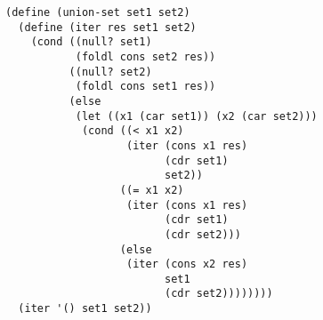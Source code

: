 \documentclass[a4paper,12pt]{article}
\begin{document}
\begin{lstlisting}
(define (union-set set1 set2)
  (define (iter res set1 set2)
    (cond ((null? set1)
           (foldl cons set2 res))
          ((null? set2)
           (foldl cons set1 res)) 
          (else
           (let ((x1 (car set1)) (x2 (car set2)))
            (cond ((< x1 x2)
                   (iter (cons x1 res)
                         (cdr set1)
                         set2))
                  ((= x1 x2)
                   (iter (cons x1 res)
                         (cdr set1)
                         (cdr set2)))
                  (else
                   (iter (cons x2 res)
                         set1
                         (cdr set2))))))))
  (iter '() set1 set2))
\end{lstlisting}
\end{document}
